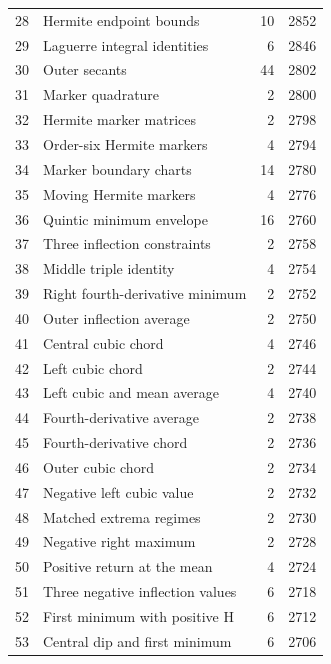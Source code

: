 \begin{longtable}{r p{} r r}
28 & Hermite endpoint bounds & 10 & 2852 \\
29 & Laguerre integral identities & 6 & 2846 \\
30 & Outer secants & 44 & 2802 \\
31 & Marker quadrature & 2 & 2800 \\
32 & Hermite marker matrices & 2 & 2798 \\
33 & Order-six Hermite markers & 4 & 2794 \\
34 & Marker boundary charts & 14 & 2780 \\
35 & Moving Hermite markers & 4 & 2776 \\
36 & Quintic minimum envelope & 16 & 2760 \\
37 & Three inflection constraints & 2 & 2758 \\
38 & Middle triple identity & 4 & 2754 \\
39 & Right fourth-derivative minimum & 2 & 2752 \\
40 & Outer inflection average & 2 & 2750 \\
41 & Central cubic chord & 4 & 2746 \\
42 & Left cubic chord & 2 & 2744 \\
43 & Left cubic and mean average & 4 & 2740 \\
44 & Fourth-derivative average & 2 & 2738 \\
45 & Fourth-derivative chord & 2 & 2736 \\
46 & Outer cubic chord & 2 & 2734 \\
47 & Negative left cubic value & 2 & 2732 \\
48 & Matched extrema regimes & 2 & 2730 \\
49 & Negative right maximum & 2 & 2728 \\
50 & Positive return at the mean & 4 & 2724 \\
51 & Three negative inflection values & 6 & 2718 \\
52 & First minimum with positive H & 6 & 2712 \\
53 & Central dip and first minimum & 6 & 2706 \\
\end{longtable}
\normalsize
